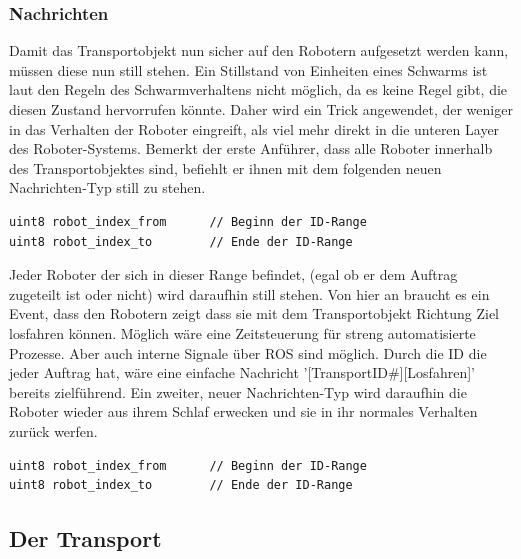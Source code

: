 \subsubsection*{Nachrichten}

Damit das Transportobjekt nun sicher auf den Robotern aufgesetzt werden kann, müssen diese nun still stehen. Ein Stillstand von Einheiten eines Schwarms ist laut den Regeln des Schwarmverhaltens nicht möglich, da es keine Regel gibt, die diesen Zustand hervorrufen könnte. Daher wird ein Trick angewendet, der weniger in das Verhalten der Roboter eingreift, als viel mehr direkt in die unteren Layer des Roboter-Systems. Bemerkt der erste Anführer, dass alle Roboter innerhalb des Transportobjektes sind, befiehlt er ihnen mit dem folgenden neuen Nachrichten-Typ still zu stehen.

\begin{lstlisting}[style=ros, title=Nachrichten-Typ: Robot\_Freeze.msg]
uint8 robot_index_from		// Beginn der ID-Range
uint8 robot_index_to		// Ende der ID-Range
\end{lstlisting}

Jeder Roboter der sich in dieser Range befindet, (egal ob er dem Auftrag zugeteilt ist oder nicht) wird daraufhin still stehen. Von hier an braucht es ein Event, dass den Robotern zeigt dass sie mit dem Transportobjekt Richtung Ziel losfahren können. Möglich wäre eine Zeitsteuerung für streng automatisierte Prozesse. Aber auch interne Signale über \ac{ROS} sind möglich. Durch die ID die jeder Auftrag hat, wäre eine einfache Nachricht '[TransportID\#][Losfahren]' bereits zielführend. Ein zweiter, neuer Nachrichten-Typ wird daraufhin die Roboter wieder aus ihrem Schlaf erwecken und sie in ihr normales Verhalten zurück werfen.

\begin{lstlisting}[style=ros, title=Nachrichten-Typ: Robot\_Continue.msg]
uint8 robot_index_from		// Beginn der ID-Range
uint8 robot_index_to		// Ende der ID-Range
\end{lstlisting}

\subsection*{Der Transport}

